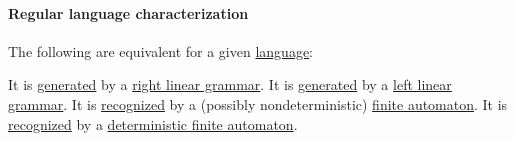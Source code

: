 \paragraph{Regular language characterization}

\begin{proposition}\label{thm:regular_languages}
  The following are equivalent for a given \hyperref[def:formal_language/language]{language}:
  \begin{thmenum}
     It is \hyperref[def:formal_grammar/language]{generated} by a \hyperref[def:chomsky_hierarchy/regular]{right linear grammar}.
     It is \hyperref[def:formal_grammar/language]{generated} by a \hyperref[def:chomsky_hierarchy/regular]{left linear grammar}.
     It is \hyperref[def:finite_automaton/language]{recognized} by a (possibly nondeterministic) \hyperref[def:finite_automaton]{finite automaton}.
     It is \hyperref[def:finite_automaton/language]{recognized} by a \hyperref[def:finite_automaton/determinism]{deterministic finite automaton}.
  \end{thmenum}
\end{proposition}
